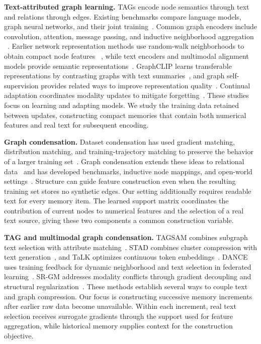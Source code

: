 \noindent\textbf{Text-attributed graph learning.}
TAGs encode node semantics through text and relations through edges. Existing
benchmarks compare language models, graph neural networks, and their joint
training~\cite{tag_benchmark}. Common graph encoders include convolution,
attention, message passing, and inductive neighborhood aggregation
~\cite{gcn,gat,mpnn,graphsage,gin}. Earlier network representation methods
use random-walk neighborhoods to obtain compact node features
~\cite{deepwalk,node2vec}, while text encoders and multimodal
alignment models provide semantic representations~\cite{bert,sbert,clip}.
GraphCLIP learns transferable representations by contrasting graphs with text
summaries~\cite{graphclip}, and graph self-supervision provides related ways
to improve representation quality~\cite{dgi,graphcl}. Continual adaptation
coordinates modality updates to mitigate forgetting~\cite{g2lora}. These
studies focus on learning and adapting models. We study the training data
retained between updates, constructing compact memories that contain both
numerical features and real text for subsequent encoding.

\noindent\textbf{Graph condensation.}
Dataset condensation has used gradient matching, distribution matching, and
training-trajectory matching to preserve the behavior of a larger training
set~\cite{dataset_gradient,dataset_distribution,trajectory_matching}.
Graph condensation extends these ideas to relational data~\cite{gcond,sfgc}
and has developed benchmarks, inductive node mappings, and open-world
settings~\cite{gcondenser,mcond,opengc}. Structure can guide feature
construction even when the resulting training set stores no synthetic edges.
Our setting additionally requires readable text for every memory item. The
learned support matrix coordinates the contribution of current nodes to
numerical features and the selection of a real text source, giving these two
components a common construction variable.

\noindent\textbf{TAG and multimodal graph condensation.}
TAGSAM combines subgraph text selection with attribute matching~\cite{tagsam}. STAD combines cluster compression with text generation~\cite{stad}, and TaLK optimizes continuous token embeddings~\cite{talk}. DANCE uses training feedback for dynamic neighborhood and text selection in federated learning~\cite{dance}. SR-GM addresses modality conflicts through gradient decoupling and structural regularization~\cite{srgm}. These methods establish several ways to couple text and graph compression. Our focus is constructing successive memory increments after earlier raw data become unavailable. Within each increment, real text selection receives surrogate gradients through the support used for feature aggregation, while historical memory supplies context for the construction objective.

